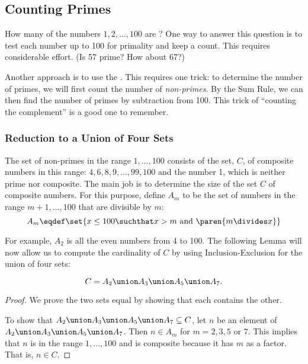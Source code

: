 \begin{editingnotes}


\subsection{Counting Primes}

How many of the numbers $1, 2, \dots, 100$ are ?  One way to
answer this question is to test each number up to 100 for primality and
keep a count.  This requires considerable effort.  (Is 57 prime?  How
about 67?)

Another approach is to use the .  This
requires one trick: to determine the number of primes, we will first count
the number of \emph{non-primes}.  By the Sum Rule, we can then find the
number of primes by subtraction from 100.  This trick of ``counting the
complement'' is a good one to remember.

\subsubsection{Reduction to a Union of Four Sets}

The set of non-primes in the range $1, \dots, 100$ consists of the set,
$C$, of composite numbers in this range: $4, 6, 8, 9, \dots, 99, 100$ and
the number 1, which is neither prime nor composite.  The main job is to
determine the size of the set $C$ of composite numbers.  For this purpose,
define $A_m$ to be the set of numbers in the range $m+1, \dots, 100$ that
are divisible by $m$:
\[
A_m \eqdef \set{x \leq 100 \suchthat x > m \text{ and } \paren{m \divides x}}
\]

For example, $A_2$ is all the even numbers from 4 to 100.  The following
Lemma will now allow us to compute the cardinality of $C$ by using
Inclusion-Exclusion for the union of four sets:

\begin{lemma}
\[
C = A_2 \union A_3 \union A_5 \union A_7.
\]
\end{lemma}

\begin{proof}
We prove the two sets equal by showing that each contains the other.

To show that $A_2 \union A_3 \union A_5 \union A_7 \subseteq C$, let $n$ be an
element of $A_2 \union A_3 \union A_5 \union A_7$.  Then $n \in A_m$ for $m = 2,
3, 5$ or $7$.  This implies that $n$ is in the range $1, \dots, 100$ and
is composite because it has $m$ as a factor.  That is, $n \in C$.


\end{proof}
\end{editingnotes}
